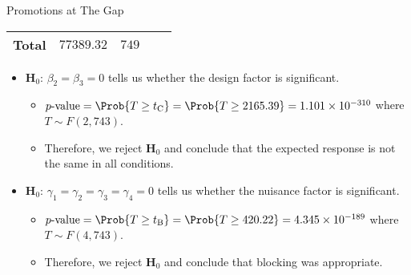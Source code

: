 \begin{Example}{Promotions at The Gap}{}
\begin{center}
\begin{NiceTabular}{|l|c|c|c|c|}
                  \midrule
                  Total     & $ 77389.32 $ & $ 749 $\\
                  \bottomrule
            \end{NiceTabular}
      \end{center}
      \begin{itemize}
            \item $ \mathbf{H}_0 $: $ \beta_2=\beta_3=0 $ tells us whether the design factor is significant.
                  \begin{itemize}
                        \item $ p\text{-value}=\Prob{T\ge t_\text{C}}=\Prob{T\ge 2165.39}=1.101\times 10^{-310} $ where $ T \sim F(2,743) $.
                        \item Therefore, we reject $ \mathbf{H}_0 $ and conclude that the expected response is not the same in all conditions.
                  \end{itemize}
            \item $ \mathbf{H}_0 $: $ \gamma_1=\gamma_2=\gamma_3=\gamma_4=0 $ tells us whether the nuisance factor is significant.
                  \begin{itemize}
                        \item $ p\text{-value}=\Prob{T\ge t_\text{B}}=\Prob{T\ge 420.22}=4.345\times 10^{-189} $ where $ T \sim F(4,743) $.
                        \item Therefore, we reject $ \mathbf{H}_0 $ and conclude that blocking was appropriate.
                  \end{itemize}
      \end{itemize}
\end{Example}
